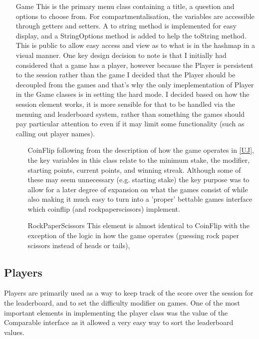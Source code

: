\documentclass{scrreprt}
\begin{document}
\begin{itemize}
	\item[Game] This is the primary menu class containing a title, a question and options to choose from. For compartmentalisation, the variables are accessible through getters and setters. A to string method is implemented for easy display, and a StringOptions method is added to help the toString method. This is public to allow easy access and view as to what is in the hashmap in a visual manner. One key design decision to note is that I initially had considered that a game has a player, however because the Player is persistent to the session rather than the game I decided that the Player should be decoupled from the games and that's why the only imeplementation of Player in the Game classes is in setting the hard mode. I decided based on how the session element works, it is more sensible for that to be handled via the menuing and leaderboard system, rather than something the games should pay particular attention to even if it may limit some functionality (such as calling out player names).
	
	\begin{itemize}
		\item[CoinFlip] following from the description of how the game operates in \ref{UJ}, the key variables in this class relate to the minimum stake, the modifier, starting points, current points, and winning streak. Although some of these may seem unnecessary (e.g. starting stake) the key purpose was to allow for a later degree of expansion on what the games consist of while also making it much easy to turn into a 'proper' bettable games interface which coinflip (and rockpaperscissors) implement. 
	\end{itemize}

	\begin{itemize}
	\item[RockPaperScissors] This element is almost identical to CoinFlip with the exception of the logic in how the game operates (guessing rock paper scissors instead of heads or tails),
\end{itemize}

	
\end{itemize}

\subsection{Players}
Players are primarily used as a way to keep track of the score over the session for the leaderboard, and to set the difficulty modifier on games. One of the most important elements in implementing the player class was the value of the Comparable interface as it allowed a very easy way to sort the leaderboard values.
\end{document}

